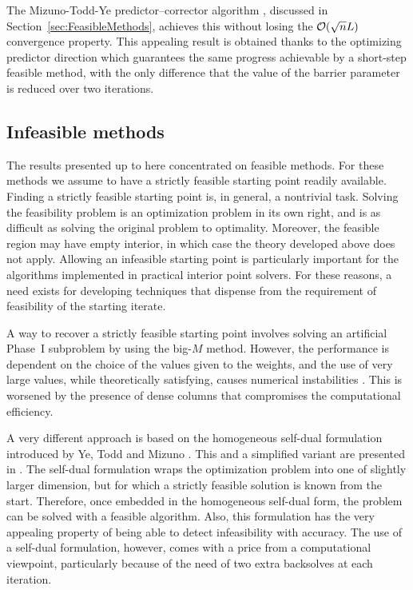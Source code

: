 The Mizuno-Todd-Ye predictor--corrector algorithm \cite{MizunoToddYe},
discussed in Section~\ref{sec:FeasibleMethods},
achieves this without losing the $\mathcal{O}(\sqrt{n}L)$ convergence property.
This appealing result is obtained thanks to the optimizing predictor
direction which guarantees the same progress achievable by a short-step 
feasible method, with the only 
difference that the value of the barrier parameter is reduced over
two iterations.

%
%
\subsection{Infeasible methods}
\label{sec:InfeasibleMethods}

The results presented up to here concentrated on feasible methods. 
For these methods we assume to have a strictly feasible starting point
readily available.
Finding a strictly feasible starting point is, in general, a nontrivial task.
Solving the feasibility problem is an optimization problem in its
own right, and is as difficult as solving the original problem
to optimality.
Moreover, the feasible region may have empty interior,
in which case the theory developed above does not apply.
Allowing an infeasible starting point is particularly important
for the algorithms implemented in practical interior point solvers.
For these reasons, a need exists for developing techniques
that dispense from the requirement of feasibility of the 
starting iterate.

A way to recover a strictly feasible starting point involves 
solving an artificial Phase~I subproblem by using 
the big-$M$ method. However, the performance is dependent on 
the choice of the values given to the weights, and the use
of very large values, while theoretically satisfying,
causes numerical instabilities \cite{Lustig91}.
This is worsened 
by the presence of dense columns that compromises the 
computational efficiency. 

A very different approach is based on the homogeneous 
self-dual formulation introduced by Ye, Todd and Mizuno
\cite{YeToddMizuno94}.
This and a simplified variant are presented in \cite[ch.~9]{ipm:Wright97}.
The self-dual formulation wraps the optimization problem into one 
of slightly larger dimension, but for which a strictly feasible solution
is known from the start.
Therefore, once embedded in the homogeneous self-dual form,
the problem can be solved with a feasible algorithm.
Also, this formulation has the very
appealing property of being able to detect infeasibility
with accuracy.
The use of a self-dual formulation, however, comes with a price from a
computational viewpoint, particularly because of the need of
two extra backsolves at each iteration.

